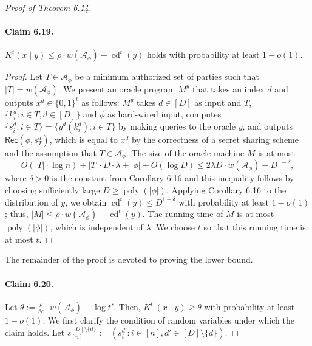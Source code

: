 \documentclass[10pt,a4paper]{article}
\begin{document}
\begin{proof}[Proof of Theorem 6.14]
\paragraph{Claim 6.19.}
$K^t(x\mid y)\leq\rho\cdot w(\mathcal A_\phi)-\operatorname{cd}^t(y)$ holds with probability at least $1-o(1)$.
\begin{proof}
Let $T\in\mathcal A_\phi$ be a minimum authorized set of parties such that $|T|=w(\mathcal A_\phi)$. We present an oracle program $M^y$ that takes an index $d$ and outputs $x^d\in\{0,1\}^\ell$ as follows: $M^y$ takes $d\in[D]$ as input and $T$, $\{k_i^d:i\in T,d\in[D]\}$ and $\phi$ as hard-wired input, computes $\{s_i^d:i\in T\}=\{y^d(k_i^d):i\in T\}$ by making queries to the oracle $y$, and outputs $\mathsf{Rec}(\phi,s_T^d)$, which is equal to $x^d$ by the correctness of a secret sharing scheme and the assumption that $T\in\mathcal A_\phi$. The size of the oracle machine $M$ is at most
\[O(|T|\cdot\log n)+|T|\cdot D\cdot\lambda+|\phi|+O(\log D)\leq2\lambda D\cdot w(\mathcal A_\phi)-D^{1-\delta},\]
where $\delta>0$ is the constant from Corollary 6.16 and this inequality follows by choosing sufficiently large $D\geq\operatorname{poly}(|\phi|)$. Applying Corollary 6.16 to the distribution of $y$, we obtain $\operatorname{cd}^t(y)\leq D^{1-\delta}$ with probability at least $1-o(1)$; thus, $|M|\leq\rho\cdot w(\mathcal A_\phi)-\operatorname{cd}^t(y)$. The running time of $M$ is at most $\operatorname{poly}(|\phi|)$, which is independent of $\lambda$. We choose $t$ so that this running time is at most $t$.
\end{proof}
The remainder of the proof is devoted to proving the lower bound.
\paragraph{Claim 6.20.}
Let $\theta:=\frac\rho{8c}\cdot w(\mathcal A_\phi)+\log t'$. Then, $K^{t'}(x\mid y)\geq\theta$ with probability at least $1-o(1)$.
We first clarify the condition of random variables under which the claim holds. Let $s_{[n]}^{[D]\setminus\{d\}}:=(s_i^{d'}:i\in[n],d'\in[D]\setminus\{d\})$.

\end{proof}
\end{document}
